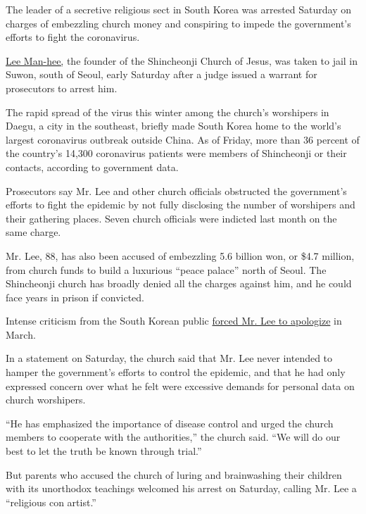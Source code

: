 The leader of a secretive religious sect in South Korea was arrested
Saturday on charges of embezzling church money and conspiring to impede
the government's efforts to fight the coronavirus.

\href{https://www.nytimes3xbfgragh.onion/2020/03/02/world/asia/coronavirus-south-korea-shincheonji.html?searchResultPosition=1}{Lee
Man-hee,} the founder of the Shincheonji Church of Jesus, was taken to
jail in Suwon, south of Seoul, early Saturday after a judge issued a
warrant for prosecutors to arrest him.

The rapid spread of the virus this winter among the church's worshipers
in Daegu, a city in the southeast, briefly made South Korea home to the
world's largest coronavirus outbreak outside China. As of Friday, more
than 36 percent of the country's 14,300 coronavirus patients were
members of Shincheonji or their contacts, according to government data.

Prosecutors say Mr. Lee and other church officials obstructed the
government's efforts to fight the epidemic by not fully disclosing the
number of worshipers and their gathering places. Seven church officials
were indicted last month on the same charge.

Mr. Lee, 88, has also been accused of embezzling 5.6 billion won, or
\$4.7 million, from church funds to build a luxurious ``peace palace''
north of Seoul. The Shincheonji church has broadly denied all the
charges against him, and he could face years in prison if convicted.

Intense criticism from the South Korean public
\href{https://www.nytimes3xbfgragh.onion/2020/03/02/world/asia/coronavirus-south-korea-shincheonji.html}{forced
Mr. Lee to apologize} in March.

In a statement on Saturday, the church said that Mr. Lee never intended
to hamper the government's efforts to control the epidemic, and that he
had only expressed concern over what he felt were excessive demands for
personal data on church worshipers.

``He has emphasized the importance of disease control and urged the
church members to cooperate with the authorities,'' the church said.
``We will do our best to let the truth be known through trial.''

But parents who accused the church of luring and brainwashing their
children with its unorthodox teachings welcomed his arrest on Saturday,
calling Mr. Lee a ``religious con artist.''

\hypertarget{-4}{%
\subsection{}\label{-4}}


